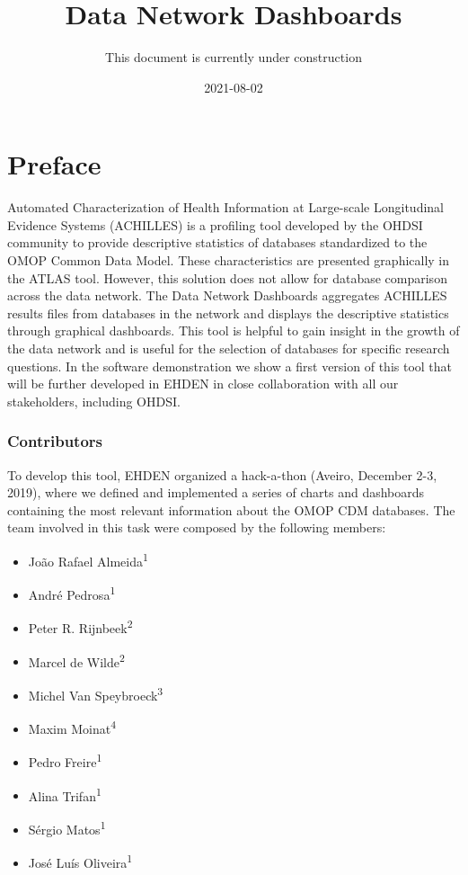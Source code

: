 \documentclass[
]{book}
\title{Data Network Dashboards}
\author{This document is currently under construction}
\date{2021-08-02}
\providecommand{\tightlist}{%
  \setlength{\itemsep}{0pt}\setlength{\parskip}{0pt}}
\begin{document}
\maketitle

{
\setcounter{tocdepth}{1}
\tableofcontents
}
\hypertarget{preface}{%
\chapter{Preface}\label{preface}}

Automated Characterization of Health Information at Large-scale Longitudinal Evidence Systems (ACHILLES) is a profiling tool developed by the OHDSI community to provide descriptive statistics of databases standardized to the OMOP Common Data Model. These characteristics are presented graphically in the ATLAS tool. However, this solution does not allow for database comparison across the data network. The Data Network Dashboards aggregates ACHILLES results files from databases in the network and displays the descriptive statistics through graphical dashboards. This tool is helpful to gain insight in the growth of the data network and is useful for the selection of databases for specific research questions. In the software demonstration we show a first version of this tool that will be further developed in EHDEN in close collaboration with all our stakeholders, including OHDSI.

\hypertarget{contributors}{%
\subsection*{Contributors}\label{contributors}}

To develop this tool, EHDEN organized a hack-a-thon (Aveiro, December 2-3, 2019), where we defined and implemented a series of charts and dashboards containing the most relevant information about the OMOP CDM databases. The team involved in this task were composed by the following members:

\begin{itemize}
\tightlist
\item
  João Rafael Almeida\textsuperscript{1}
\item
  André Pedrosa\textsuperscript{1}
\item
  Peter R. Rijnbeek\textsuperscript{2}
\item
  Marcel de Wilde\textsuperscript{2}
\item
  Michel Van Speybroeck\textsuperscript{3}
\item
  Maxim Moinat\textsuperscript{4}
\item
  Pedro Freire\textsuperscript{1}
\item
  Alina Trifan\textsuperscript{1}
\item
  Sérgio Matos\textsuperscript{1}
\item
  José Luís Oliveira\textsuperscript{1}
\end{itemize}
\end{document}
